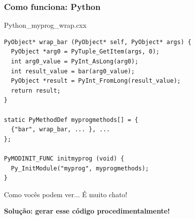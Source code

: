 \documentclass[brazil]{beamer}
\begin{document}
\begin{frame}[fragile]
  \frametitle{Como funciona: Python}
  \pause
  \begin{block}{Python\_myprog\_wrap.cxx}
    \begin{lstlisting}
PyObject* wrap_bar (PyObject* self, PyObject* args) {
  PyObject *arg0 = PyTuple_GetItem(args, 0);
  int arg0_value = PyInt_AsLong(arg0);
  int result_value = bar(arg0_value);
  PyObject *result = PyInt_FromLong(result_value);
  return result;
}

static PyMethodDef myprogmethods[] = {
  {"bar", wrap_bar, ... }, ...
};

PyMODINIT_FUNC initmyprog (void) {
  Py_InitModule("myprog", myprogmethods);
}
    \end{lstlisting}
  \end{block}
\end{frame}
\begin{frame}[fragile]
  \begin{center}
    Como vocês podem ver... \pause É muito chato!
  \end{center}
  \pause
  \begin{center}
    \textbf{Solução: gerar esse código procedimentalmente!}
  \end{center}
\end{frame}
\end{document}

